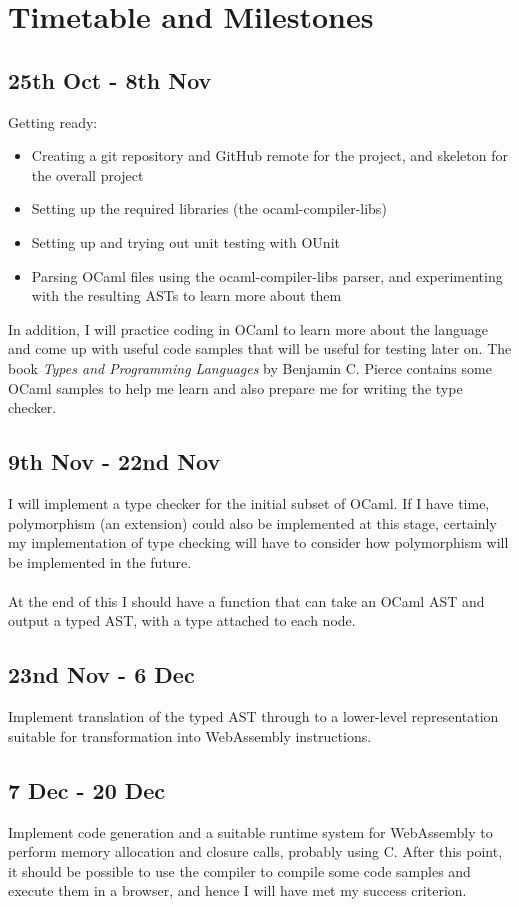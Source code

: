 \documentclass[12pt]{article}
\begin{document}
	
	\section*{Timetable and Milestones}
	
	\subsection*{25th Oct - 8th Nov}
	Getting ready:
	\begin{itemize}
		\item Creating a git repository and GitHub remote for the project, and skeleton for the overall project
		\item Setting up the required libraries (the ocaml-compiler-libs)
		\item Setting up and trying out unit testing with OUnit
		\item Parsing OCaml files using the ocaml-compiler-libs parser, and experimenting with the resulting ASTs to learn more about them 
	\end{itemize}
	In addition, I will practice coding in OCaml to learn more about the language and come up with useful code samples that will be useful for testing later on. The book \textit{Types and Programming Languages} by Benjamin C. Pierce contains some OCaml samples to help me learn and also prepare me for writing the type checker.
	
	\subsection*{9th Nov - 22nd Nov}
	I will implement a type checker for the initial subset of OCaml. If I have time, polymorphism (an extension) could also be implemented at this stage, certainly my implementation of type checking will have to consider how polymorphism will be implemented in the future.
	\\\\
	At the end of this I should have a function that can take an OCaml AST and output a typed AST, with a type attached to each node.
	
	\subsection*{23nd Nov - 6 Dec}
	Implement translation of the typed AST through to a lower-level representation suitable for transformation into WebAssembly instructions.
	
	\subsection*{7 Dec - 20 Dec}
	Implement code generation and a suitable runtime system for WebAssembly to perform memory allocation and closure calls, probably using C. After this point, it should be possible to use the compiler to compile some code samples and execute them in a browser, and hence I will have met my success criterion.
	
\end{document}

